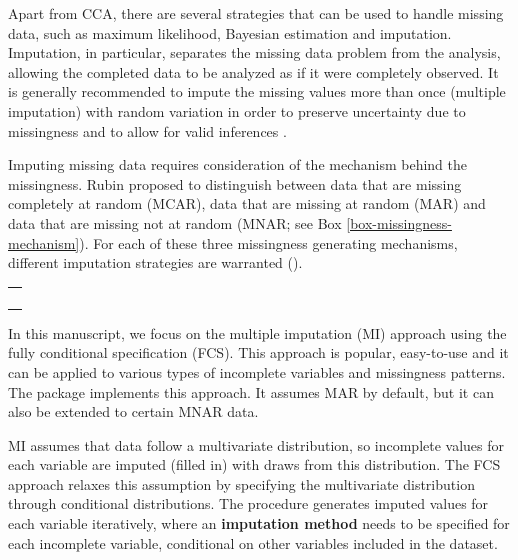 \documentclass[
  article]{jss}
\newcounter{boxedmanual}
\newenvironment{boxedmanual}[1][]
{\begin{center}
\refstepcounter{boxedmanual}\par\medskip
\begin{tabular}{|p{0.99\textwidth}|}
\hline\\
{\centering\textbf{Box~\theboxedmanual: #1} \rmfamily{\medskip} \\}
}
{
\\\\\hline
\end{tabular}
\end{center}
}
\begin{document}
Apart from CCA, there are several strategies that can be used to handle
missing data, such as maximum likelihood, Bayesian estimation and
imputation. Imputation, in particular, separates the missing data
problem from the analysis, allowing the completed data to be analyzed as
if it were completely observed. It is generally recommended to impute
the missing values more than once (multiple imputation) with random
variation in order to preserve uncertainty due to missingness and to
allow for valid inferences \citep{rubin76}.

Imputing missing data requires consideration of the mechanism behind the
missingness. Rubin proposed to distinguish between data that are missing
completely at random (MCAR), data that are missing at random (MAR) and
data that are missing not at random (MNAR; see Box
\ref{box-missingness-mechanism}). For each of these three missingness
generating mechanisms, different imputation strategies are warranted
(\citep{yuce08,hox15}).

\begin{boxedmanual}[Missingness Mechanism]
\label{box-missingness-mechanism}

\begin{itemize}
    \setlength\itemsep{0.1em}
     \item \textbf{Missing Completely At Random (MCAR):} the probability of data being missing is equal across all entries in the dataset.
    \item \textbf{Missing At Random (MAR):} the likelihood of data being missing depends on observed information within the dataset.
    \item \textbf{Missing Not At Random (MNAR):} the probability of data being missing depending on unrecorded information, making the missingness non-ignorable \citep{rubin76}.
\end{itemize}
\end{boxedmanual}

In this manuscript, we focus on the multiple imputation (MI) approach
using the fully conditional specification (FCS). This approach is
popular, easy-to-use and it can be applied to various types of
incomplete variables and missingness patterns. The  package
 implements this approach. It assumes MAR by default, but it
can also be extended to certain MNAR data.

MI assumes that data follow a multivariate distribution, so incomplete
values for each variable are imputed (filled in) with draws from this
distribution. The FCS approach relaxes this assumption by specifying the
multivariate distribution through conditional distributions. The
procedure generates imputed values for each variable iteratively, where
an \textbf{imputation method} needs to be specified for each incomplete
variable, conditional on other variables included in the dataset.
\end{document}
